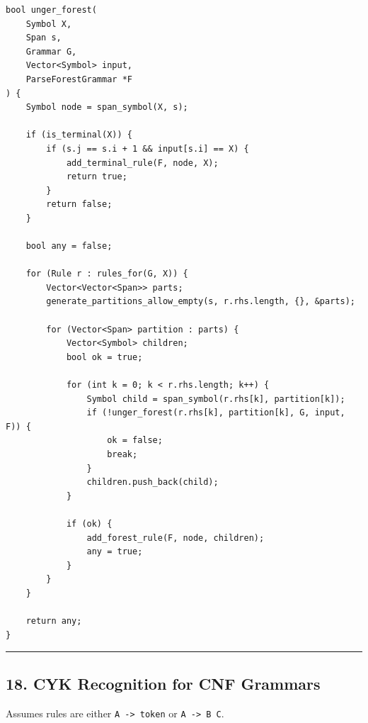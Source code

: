 \documentclass[10pt,letterpaper]{article}
\begin{document}
\begin{verbatim}
bool unger_forest(
    Symbol X,
    Span s,
    Grammar G,
    Vector<Symbol> input,
    ParseForestGrammar *F
) {
    Symbol node = span_symbol(X, s);

    if (is_terminal(X)) {
        if (s.j == s.i + 1 && input[s.i] == X) {
            add_terminal_rule(F, node, X);
            return true;
        }
        return false;
    }

    bool any = false;

    for (Rule r : rules_for(G, X)) {
        Vector<Vector<Span>> parts;
        generate_partitions_allow_empty(s, r.rhs.length, {}, &parts);

        for (Vector<Span> partition : parts) {
            Vector<Symbol> children;
            bool ok = true;

            for (int k = 0; k < r.rhs.length; k++) {
                Symbol child = span_symbol(r.rhs[k], partition[k]);
                if (!unger_forest(r.rhs[k], partition[k], G, input, F)) {
                    ok = false;
                    break;
                }
                children.push_back(child);
            }

            if (ok) {
                add_forest_rule(F, node, children);
                any = true;
            }
        }
    }

    return any;
}
\end{verbatim}

\medskip\hrule\medskip

\subsection*{18. CYK Recognition for CNF Grammars}

Assumes rules are either \texttt{A -> token} or \texttt{A -> B C}.
\end{document}
